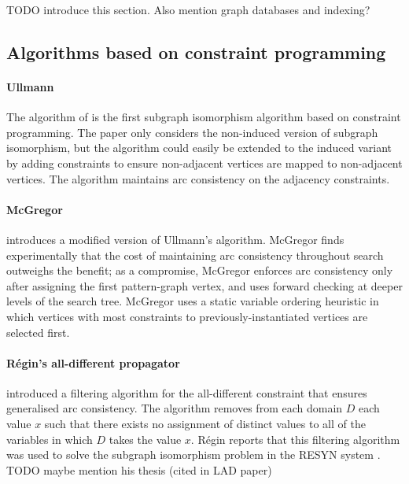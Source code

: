 TODO introduce this section. Also mention graph databases and indexing?

\subsection{Algorithms based on constraint programming}

\paragraph*{Ullmann} 
The algorithm of \citet{ullmann1976algorithm} 
is the first subgraph isomorphism algorithm based on constraint programming.
The paper only considers the non-induced version of subgraph isomorphism,
but the algorithm could easily be extended to the induced variant by adding
constraints to ensure non-adjacent vertices are mapped to non-adjacent vertices.
The algorithm maintains arc consistency on the adjacency constraints.

\paragraph*{McGregor}
\citet{DBLP:journals/isci/McGregor79} introduces a modified version of
Ullmann's algorithm.  McGregor finds experimentally that the cost of maintaining
arc consistency throughout search outweighs the benefit; as a compromise,
McGregor enforces arc consistency only after assigning the first pattern-graph
vertex, and uses forward checking at deeper levels of the search tree.
McGregor uses a static variable ordering heuristic in which vertices
with most constraints to previously-instantiated vertices are selected first.

\paragraph*{R{\'{e}}gin's all-different propagator}
\citet{DBLP:conf/aaai/Regin94}
introduced a filtering algorithm for the all-different constraint that
ensures generalised arc consistency.  The algorithm removes from each domain
$D$ each value $x$ such that there exists no assignment of distinct
values to all of the variables in which $D$ takes the value $x$.
R{\'{e}}gin reports that this filtering algorithm was used to solve
the subgraph isomorphism problem in the RESYN system \citep{vism92}.
TODO maybe mention his thesis (cited in LAD paper)

